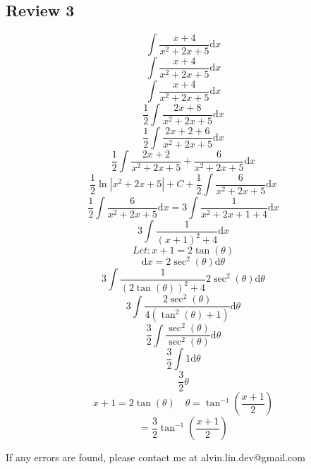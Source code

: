 \documentclass[letterpaper, 12pt]{article}
\renewcommand*{\arctan}{\tan^{-1}}
\newcommand*{\diff}{\mathrm{d}}
\begin{document}
\subsection*{Review 3}
\[ \int{\frac{x+4}{x^{2}+2x+5}\diff{x}} \]
\[ \int{\frac{x+4}{x^{2}+2x+5}\diff{x}} \]
\[ \int{\frac{x+4}{x^{2}+2x+5}\diff{x}} \]
\[ \frac{1}{2}\int{\frac{2x+8}{x^{2}+2x+5}\diff{x}} \]
\[ \frac{1}{2}\int{\frac{2x+2+6}{x^{2}+2x+5}\diff{x}} \]
\[ \frac{1}{2}\int{\frac{2x+2}{x^{2}+2x+5}+\frac{6}{x^{2}+2x+5}\diff{x}} \]
\[ \frac{1}{2}\ln|x^{2}+2x+5|+C+\frac{1}{2}\int{\frac{6}{x^{2}+2x+5}\diff{x}} \]
\[ \frac{1}{2}\int{\frac{6}{x^{2}+2x+5}\diff{x}} =
   3\int{\frac{1}{x^{2}+2x+1+4}\diff{x}} \]
\[ 3\int{\frac{1}{(x+1)^{2}+4}\diff{x}} \]
\[ Let: x+1 = 2\tan(\theta) \]
\[ \diff{x} = 2\sec^{2}(\theta)\diff{\theta} \]
\[ 3\int{\frac{1}{(2\tan(\theta))^{2}+4}2\sec^{2}(\theta)\diff{\theta}} \]
\[ 3\int{\frac{2\sec^{2}(\theta)}{4(\tan^{2}(\theta)+1)}\diff{\theta}} \]
\[ \frac{3}{2}\int{\frac{\sec^{2}(\theta)}{\sec^{2}(\theta)}\diff{\theta}} \]
\[ \frac{3}{2}\int{1\diff{\theta}} \]
\[ \frac{3}{2}\theta \]
\[ x+1 = 2\tan(\theta) \quad \theta = \arctan(\frac{x+1}{2}) \]
\[ = \frac{3}{2}\arctan(\frac{x+1}{2}) \]

\begin{center}
  If any errors are found, please contact me at alvin.lin.dev@gmail.com
\end{center}
\end{document}
